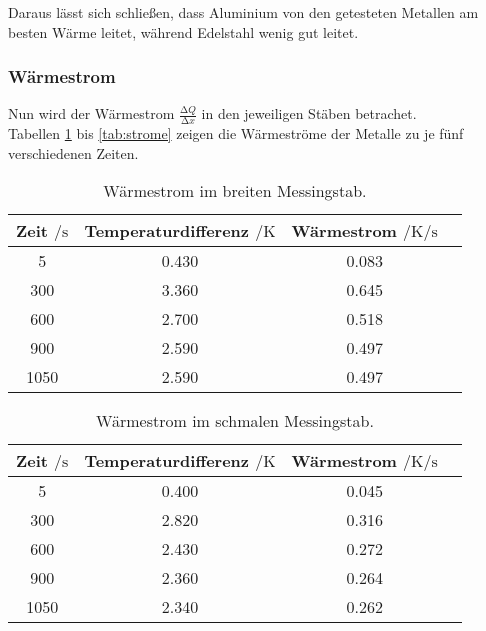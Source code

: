   \noindent Daraus lässt sich schließen, dass Aluminium von den getesteten Metallen am besten Wärme leitet, während Edelstahl wenig gut leitet.

  \subsubsection{Wärmestrom}
  Nun wird der Wärmestrom $ \frac{\increment Q}{\increment x}$ in den jeweiligen Stäben betrachet. \\
  Tabellen \ref{tab:strom} bis \ref{tab:strome} zeigen die Wärmeströme der Metalle zu je fünf verschiedenen Zeiten. 

  \begin{table}
    \centering
    \caption{Wärmestrom im breiten Messingstab.}
    \label{tab:strom}
    \begin{tabular}{c c c c}
      \toprule
      Zeit $\mathbin{/} \si{\s}$ & Temperaturdifferenz $\mathbin{/} \si{\kelvin}$& Wärmestrom $\mathbin{/} \si{\kelvin\per\s}$\\
      \midrule
      5 & 0.430 & 0.083 \\
      300 & 3.360 & 0.645 \\
      600 & 2.700 & 0.518 \\
      900 & 2.590 & 0.497 \\
      1050 & 2.590 & 0.497\\
      \bottomrule
    \end{tabular}
  \end{table}

  \begin{table}
    \centering
    \caption{Wärmestrom im schmalen Messingstab.}
    \label{tabl:stroms}
    \begin{tabular}{c c c c}
      \toprule
      Zeit $\mathbin{/} \si{\s}$ & Temperaturdifferenz $\mathbin{/} \si{\kelvin}$& Wärmestrom $\mathbin{/} \si{\kelvin\per\s}$\\
      \midrule
      5 & 0.400 & 0.045\\
      300 & 2.820 & 0.316\\
      600 & 2.430 & 0.272\\
      900 & 2.360 & 0.264\\
      1050 & 2.340 & 0.262\\ %
      \bottomrule
    \end{tabular}
  \end{table}

